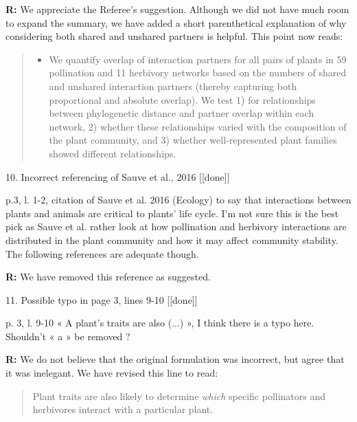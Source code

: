 \documentclass[12pt]{letter}
\newenvironment{refquote}{\bigskip \begin{it}}{\end{it}\smallskip}
\begin{document}
		\textbf{R:} We appreciate the Referee's suggestion. Although we did not have much room to expand the summary, we have added a short parenthetical explanation of why considering both shared and unshared partners is helpful. This point now reads:

		\begin{quotation}

			\begin{itemize}
			\item We quantify overlap of interaction partners for all pairs of plants in 59 pollination and 11 herbivory networks based on the numbers of shared and unshared interaction partners (thereby capturing both proportional and absolute overlap). We test 1) for relationships between phylogenetic distance and partner overlap within each network, 2) whether these relationships varied with the composition of the plant community, and 3) whether well-represented plant families showed different relationships. 
		\end{itemize}

		\end{quotation}


	10. Incorrect referencing of Sauve et al., 2016 [[done]]

		\begin{refquote}
			p.3, l. 1-2, citation of Sauve et al. 2016 (Ecology) to say that interactions between plants and animals are critical to plants’ life cycle. I’m not sure this is the best pick as Sauve et al. rather look at how pollination and herbivory interactions are distributed in the plant community and how it may affect community stability. The following references are adequate though.
		\end{refquote}

		\textbf{R:} We have removed this reference as suggested.


	11. Possible typo in page 3, lines 9-10 [[done]]
		
		\begin{refquote}
			p. 3, l. 9-10 « A plant’s traits are also (...) », I think there is a typo here. Shouldn’t « a » be removed ?
		\end{refquote}


		\textbf{R:} We do not believe that the original formulation was incorrect, but agree that it was inelegant. We have revised this line to read:

		\begin{quotation}
			Plant traits are also likely to determine \emph{which} specific pollinators 
			  and herbivores interact with a particular plant.
	  	\end{quotation}
\end{document}
